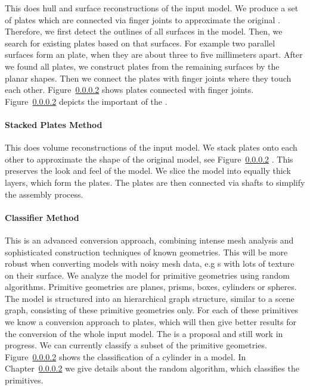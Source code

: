 \documentclass[../ClassicThesis.tex]{subfiles}
\begin{document}
This {\fabmethod} does hull and surface reconstructions of
the input model. We produce a set of plates which are
connected via finger joints to approximate the original
{\threedmodel}. Therefore, we first detect the outlines of
all surfaces in the model. Then, we search for existing
plates based on that surfaces. For example two parallel
surfaces form an  plate, when they are about
three to five millimeters apart. After we found all
 plates, we construct plates from the
remaining surfaces by  the planar shapes.
Then we connect the plates with finger joints where they
touch each other. Figure~\ref{}  shows plates connected with finger joints.
Figure~\ref{} 
depicts the important  of the
.


\paragraph{Stacked Plates Method}

This {\fabmethod} does volume reconstructions of the input
model. We stack plates onto each other to approximate the
shape of the original model, see Figure~\ref{} . This preserves the look and feel of
the model. We slice the model into equally thick layers,
which form the plates. The plates are then connected via
shafts to simplify the assembly process.


\paragraph{Classifier Method}

This is an advanced conversion approach, combining intense
mesh analysis and sophisticated construction techniques of
known geometries. This {\fabmethod} will be more robust when
converting models with noisy mesh data, e.g {\threedmodel}s
with lots of texture on their surface. We analyze the model
for primitive geometries using random algorithms. Primitive
geometries are planes, prisms, boxes, cylinders or spheres.
The model is structured into an hierarchical graph
structure, similar to a scene graph, consisting of these
primitive geometries only. For each of these primitives we
know a conversion approach to plates, which will then give
better results for the conversion of the whole input model.
The  is a proposal and still work in
progress. We can currently classify a subset of the
primitive geometries. Figure~\ref{}  shows the classification of a cylinder in a
model. In Chapter~\ref{}  we give
details about the random algorithm, which classifies the
primitives.
\end{document}
